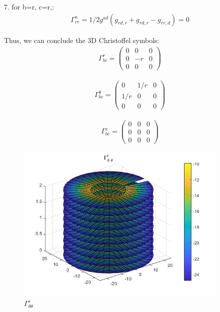 \documentclass{Note}
\begin{document}
7. for b=r, c=r,:
\begin{equation}
\begin{aligned}
\Gamma_{rr}^a=1/2 g^{ad}(g_{rd,r}+g_{rd,r}-g_{rr,d})=0
\end{aligned}
\end{equation}

Thus, we can conclude the 3D Christoffel symbols:
\begin{equation}
\begin{aligned}
\Gamma_{bc}^r=
\begin{pmatrix}
0 & 0 & 0\\ 0 &-r & 0\\0 & 0 &0
\end{pmatrix}
\end{aligned}
\end{equation}

\begin{equation}
\begin{aligned}
\Gamma_{bc}^\theta=
\begin{pmatrix}
0 & 1/r & 0\\1/r &0 & 0\\0 & 0 &0
\end{pmatrix}
\end{aligned}
\end{equation}

\begin{equation}
\begin{aligned}
\Gamma_{bc}^z=
\begin{pmatrix}
0 & 0 & 0\\ 0 &0 & 0\\0 & 0 &0
\end{pmatrix}
\end{aligned}
\end{equation}

\begin{figure}
  \centerline{\includegraphics[width=4in]{Gamma_theta_theta^r.jpg}}
  \caption{$\Gamma_{\theta\theta}^r$}
  \end{figure}
  
\end{document}
